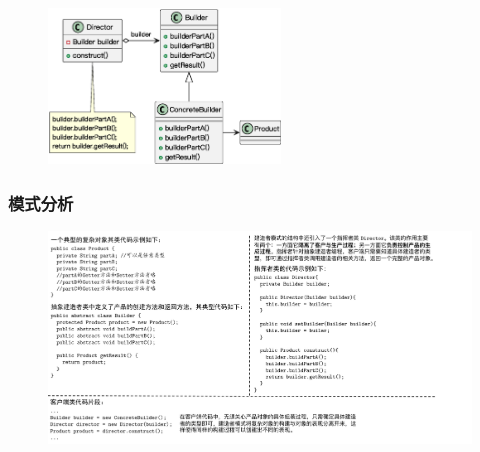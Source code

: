 \begin{figure}[H]
    \vspace{-0.5em}
	\centering
	\includegraphics[width=0.55\textwidth]{images/建造者模式结构.eps}
    \vspace{-1em}
\end{figure}

\subsubsection{模式分析}
\begin{figure}[H]
    \vspace{-0.5em}
	\centering
	\includegraphics[width=\textwidth]{images/建造者模式分析.pdf}
    \vspace{-2em}
\end{figure}

